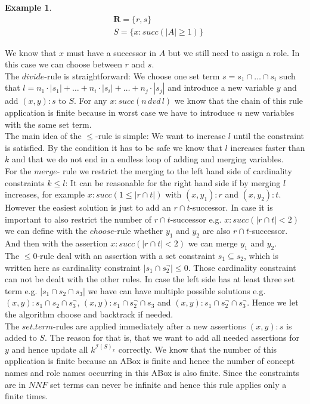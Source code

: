 \documentclass[a4paper,11pt]{scrartcl}
\theoremstyle{break}
\theoremstyle{definition}
\newtheorem{ex}{Example}
\begin{document}
\begin{ex}
\begin{align*}
&\mathbf{R}=\{r,s\}\\
&S=\{x:succ(|A|\geq 1)\}
\end{align*} 
\end{ex}
We know that $x$ must have a successor in $A$ but we still need to assign a role. In this case we can choose between $r$ and $s$.
\\
The $divide$-rule is straightforward: We choose one set term $s=s_1\cap\dots\cap s_i$ such that $l=n_1\cdot|s_1|+\dots+n_i\cdot|s_i|+\dots+n_j\cdot|s_j|$ and introduce a new variable $y$ and add $(x,y):s$ to $S$. For any $x:succ(n\,dvd\,l)$ we know that the chain of this rule application is finite because in worst case we have to introduce $n$ new variables with the same set term.
\\
The main idea of the $\leq$-rule is simple: We want to increase $l$ until the constraint is satisfied. By the condition it has to be safe we know that $l$ increases faster than $k$ and that we do not end in a endless loop of adding and merging variables.\\
For the $merge$- rule we restrict the merging to the left hand side of cardinality constraints $k\leq l$: It can be reasonable for the right hand side if by merging $l$ increases, for example $x:succ(1\leq |r\cap t|)$ with $(x,y_1):r$ and $(x,y_2):t$. However the easiest solution is just to add an $r\cap t$-successor. In case it is important to also restrict the number of $r\cap t$-successor e.g. $x:succ(|r\cap t|<2)$ we can define with the $choose$-rule whether $y_1$ and $y_2$ are also $r\cap t$-successor. And then with the assertion $x:succ(|r\cap t|<2)$ we can merge $y_1$ and $y_2$.\\
The $\leq 0$-rule deal with an assertion with a set constraint $s_1\subseteq s_2$, which is written here as cardinality constraint $|s_1\cap s_2^\neg|\leq 0$. Those cardinality constraint can not be dealt with the other rules. In case the left side has at least three set term  e.g. $|s_1\cap s_2\cap s_3|$ we have can have multiple possible solutions e.g. $(x,y):s_1\cap s_2\cap s_3^\neg$, $(x,y):s_1\cap s_2^\neg\cap s_3$ and $(x,y):s_1\cap s_2^\neg\cap s_3^\neg$. Hence we let the algorithm choose and backtrack if needed.\\
The $set.term$-rules are applied immediately after a new assertions $(x,y):s$ is added to $S$. The reason for that is, that we want to add all needed assertions for $y$ and hence update all $k^{\mathcal{I}(S)_x}$ correctly. We know that the number of this application is finite because an ABox is finite and hence the number of concept names and role names occurring in this ABox is also finite. Since the constraints are in $NNF$ set terms can never be infinite and hence this rule applies only a finite times.
\end{document}
